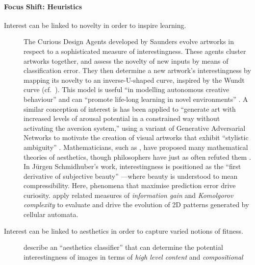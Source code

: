 \paragraph{\textbf{\upshape Focus Shift: Heuristics}} 
                                         
\begin{description}                      
\item[Interest can be linked to novelty in order to inspire learning.]
  The {\sf Curious Design Agents} developed by Saunders
  \cite{Saunders2007} evolve artworks in respect to a sophisticated
  measure of interestingness.  These agents cluster artworks together,
  and assess the novelty of new inputs by means of classification
  error.  They then determine a new artwork's interestingness by
  mapping its novelty to an inverse-U-shaped curve, inspired by the
  Wundt curve (cf.~\citet[pp.~17--19]{berlyne2013pleasure}).  This
  model is useful ``in modelling autonomous creative behaviour'' and
  can ``promote life-long learning in novel environments''
  \cite{saunders2010curious}.
  A similar conception of interest is has been applied to ``generate
  art with increased levels of arousal potential in a constrained way
  without activating the aversion system,'' using a variant of
  Generative Adversarial Networks to motivate the creation of
  visual artworks that exhibit ``stylistic ambiguity'' \cite[p.~97]{elgammal2017can}.
  Mathematicians, such as
  \citet{birkhoff1933aesthetic}, have proposed many mathematical
  theories of aesthetics, though philosophers have just as often
  refuted them \cite[p.~4]{hyman2006objective}.  In J\"urgen
  Schmidhuber's work, interestingness is positioned as the ``first
  derivative of subjective beauty'' \cite{schmidhuber2009art}---where
  beauty is understood to mean compressibility.  Here, phenomena that
  maximise prediction error drive curiosity.
  \citet{javaheri2016analysis} apply related measures of
  \emph{information gain} and \emph{Komolgorov complexity} to evaluate
  and drive the evolution of 2D patterns generated by cellular
  automata.
\item[Interest can be linked to aesthetics in order to capture varied notions of fitness.]
  \citet{dhar2011high} describe an ``aesthetics
  classifier'' that can determine the potential interestingness of
  images in terms of \emph{high level content} and \emph{compositional
}
\end{description}

